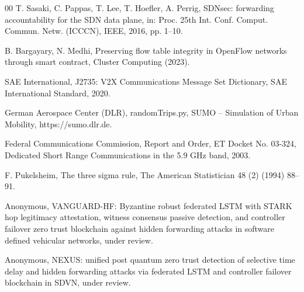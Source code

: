 \documentclass[final,5p,twocolumn]{elsarticle}
\theoremstyle{remark}
\theoremstyle{plain}
\begin{document}
\begin{thebibliography}{00}
	T. Sasaki, C. Pappas, T. Lee, T. Hoefler, A. Perrig, SDNsec: forwarding accountability for the SDN data plane, in: Proc. 25th Int. Conf. Comput. Commun. Netw. (ICCCN), IEEE, 2016, pp. 1--10.

	B. Bargayary, N. Medhi, Preserving flow table integrity in OpenFlow networks through smart contract, Cluster Computing (2023).

	SAE International, J2735: V2X Communications Message Set Dictionary, SAE International Standard, 2020.

	German Aerospace Center (DLR), randomTrips.py, SUMO -- Simulation of Urban Mobility, https://sumo.dlr.de.

	Federal Communications Commission, Report and Order, ET Docket No. 03-324, Dedicated Short Range Communications in the 5.9 GHz band, 2003.

	F. Pukelsheim, The three sigma rule, The American Statistician 48 (2) (1994) 88--91.

	Anonymous, VANGUARD-HF: Byzantine robust federated LSTM with STARK hop legitimacy attestation, witness consensus passive detection, and controller failover zero trust blockchain against hidden forwarding attacks in software defined vehicular networks, under review.

	Anonymous, NEXUS: unified post quantum zero trust detection of selective time delay and hidden forwarding attacks via federated LSTM and controller failover blockchain in SDVN, under review.

\end{thebibliography}
\end{document}

